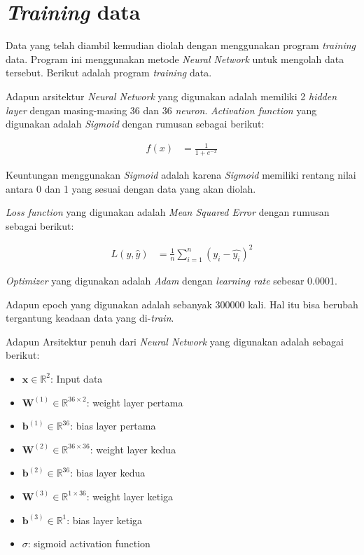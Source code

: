\section{\textit{Training} data
  \label{sec:trainingdata}}

Data yang telah diambil kemudian diolah dengan menggunakan program \textit{training} data. Program ini menggunakan metode \textit{Neural Network} untuk mengolah data tersebut. Berikut adalah program \textit{training} data. 

Adapun arsitektur \textit{Neural Network} yang digunakan adalah memiliki 2 \textit{hidden layer} dengan masing-masing 36 dan 36 \textit{neuron}. \textit{Activation function} yang digunakan adalah \textit{Sigmoid} dengan rumusan sebagai berikut: 

\begin{equation}
  \begin{aligned}
    f(x) &= \frac{1}{1 + e^{-x}}
  \end{aligned}
\end{equation}

Keuntungan menggunakan \textit{Sigmoid} adalah karena \textit{Sigmoid} memiliki rentang nilai antara 0 dan 1 yang sesuai dengan data yang akan diolah. 

\textit{Loss function} yang digunakan adalah \textit{Mean Squared Error} dengan rumusan sebagai berikut: 

\begin{equation}
  \begin{aligned}
    L(y, \hat{y}) &= \frac{1}{n} \sum_{i=1}^{n} (y_i - \hat{y_i})^2
  \end{aligned}
\end{equation}

\textit{Optimizer} yang digunakan adalah \textit{Adam} dengan \textit{learning rate} sebesar 0.0001.

Adapun epoch yang digunakan adalah sebanyak 300000 kali. Hal itu bisa berubah tergantung keadaan data yang di-\textit{train}. 

Adapun Arsitektur penuh dari \textit{Neural Network} yang digunakan adalah sebagai berikut: 

\begin{itemize}
    \item \( \mathbf{x} \in \mathbb{R}^2 \): Input data
    \item \( \mathbf{W}^{(1)} \in \mathbb{R}^{36 \times 2} \): weight layer pertama
    \item \( \mathbf{b}^{(1)} \in \mathbb{R}^{36} \): bias layer pertama
    \item \( \mathbf{W}^{(2)} \in \mathbb{R}^{36 \times 36} \): weight layer kedua
    \item \( \mathbf{b}^{(2)} \in \mathbb{R}^{36} \): bias layer kedua
    \item \( \mathbf{W}^{(3)} \in \mathbb{R}^{1 \times 36} \): weight layer ketiga
    \item \( \mathbf{b}^{(3)} \in \mathbb{R}^{1} \): bias layer ketiga
    \item \( \sigma \): sigmoid activation function
\end{itemize}


